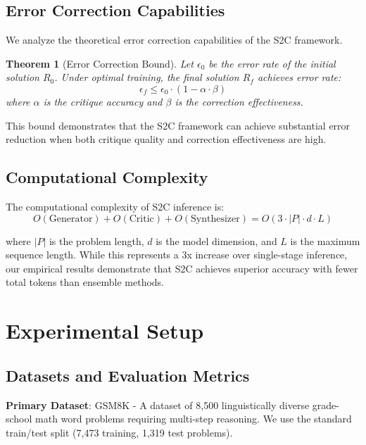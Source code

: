 \documentclass[10pt,twocolumn]{article}
\newtheorem{theorem}{Theorem}
\newcommand{\ssc}{\textsc{S2C}}
\begin{document}
\subsection{Error Correction Capabilities}

We analyze the theoretical error correction capabilities of the \ssc{} framework.

\begin{theorem}[Error Correction Bound]
Let $\epsilon_0$ be the error rate of the initial solution $R_0$. Under optimal training, the final solution $R_f$ achieves error rate:
\begin{equation}
\epsilon_f \leq \epsilon_0 \cdot (1 - \alpha \cdot \beta)
\end{equation}
where $\alpha$ is the critique accuracy and $\beta$ is the correction effectiveness.
\end{theorem}

This bound demonstrates that the \ssc{} framework can achieve substantial error reduction when both critique quality and correction effectiveness are high.

\subsection{Computational Complexity}

The computational complexity of \ssc{} inference is:
\begin{equation}
O(\text{Generator}) + O(\text{Critic}) + O(\text{Synthesizer}) = O(3 \cdot |P| \cdot d \cdot L)
\end{equation}

where $|P|$ is the problem length, $d$ is the model dimension, and $L$ is the maximum sequence length. While this represents a 3x increase over single-stage inference, our empirical results demonstrate that \ssc{} achieves superior accuracy with fewer total tokens than ensemble methods.

\section{Experimental Setup}

\subsection{Datasets and Evaluation Metrics}

\textbf{Primary Dataset}: GSM8K - A dataset of 8,500 linguistically diverse grade-school math word problems requiring multi-step reasoning. We use the standard train/test split (7,473 training, 1,319 test problems).
\end{document}
